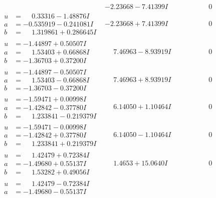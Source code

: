 \documentclass[1p]{elsarticle_modified}
\theoremstyle{definition}
\begin{document}
$$\begin{array}{c|c|c}
 & -2.23668 - 7.41399 I & \phantom{-0.000000 } 0 \\ \hline\begin{aligned}
u &= \phantom{-}0.33316 - 1.48876 I \\
a &= -0.535919 - 0.241081 I \\
b &= \phantom{-}1.319861 + 0.286645 I\end{aligned}
 & -2.23668 + 7.41399 I & \phantom{-0.000000 } 0 \\ \hline\begin{aligned}
u &= -1.44897 + 0.50507 I \\
a &= \phantom{-}1.53403 + 0.66868 I \\
b &= -1.36703 + 0.37200 I\end{aligned}
 & \phantom{-}7.46963 - 8.93919 I & \phantom{-0.000000 } 0 \\ \hline\begin{aligned}
u &= -1.44897 - 0.50507 I \\
a &= \phantom{-}1.53403 - 0.66868 I \\
b &= -1.36703 - 0.37200 I\end{aligned}
 & \phantom{-}7.46963 + 8.93919 I & \phantom{-0.000000 } 0 \\ \hline\begin{aligned}
u &= -1.59471 + 0.00998 I \\
a &= -1.42842 - 0.37780 I \\
b &= \phantom{-}1.233841 - 0.219379 I\end{aligned}
 & \phantom{-}6.14050 + 1.10464 I & \phantom{-0.000000 } 0 \\ \hline\begin{aligned}
u &= -1.59471 - 0.00998 I \\
a &= -1.42842 + 0.37780 I \\
b &= \phantom{-}1.233841 + 0.219379 I\end{aligned}
 & \phantom{-}6.14050 - 1.10464 I & \phantom{-0.000000 } 0 \\ \hline\begin{aligned}
u &= \phantom{-}1.42479 + 0.72384 I \\
a &= -1.49680 + 0.55137 I \\
b &= \phantom{-}1.53282 + 0.49056 I\end{aligned}
 & \phantom{-}1.4653 + 15.0640 I & \phantom{-0.000000 } 0 \\ \hline\begin{aligned}
u &= \phantom{-}1.42479 - 0.72384 I \\
a &= -1.49680 - 0.55137 I \\

\end{aligned}
\end{array}$$
\end{document}
